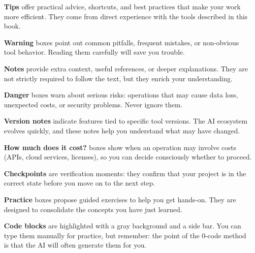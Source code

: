 \begin{tipbox}
\textbf{Tips} offer practical advice, shortcuts, and best practices that make your work more efficient. They come from direct experience with the tools described in this book.
\end{tipbox}

\begin{warnbox}
\textbf{Warning} boxes point out common pitfalls, frequent mistakes, or non-obvious tool behavior. Reading them carefully will save you trouble.
\end{warnbox}

\begin{notebox}
\textbf{Notes} provide extra context, useful references, or deeper explanations. They are not strictly required to follow the text, but they enrich your understanding.
\end{notebox}

\begin{dangerbox}
\textbf{Danger} boxes warn about serious risks: operations that may cause data loss, unexpected costs, or security problems. Never ignore them.
\end{dangerbox}

\begin{versionbox}
\textbf{Version notes} indicate features tied to specific tool versions. The AI ecosystem evolves quickly, and these notes help you understand what may have changed.
\end{versionbox}

\begin{costbox}
\textbf{How much does it cost?} boxes show when an operation may involve costs (APIs, cloud services, licenses), so you can decide consciously whether to proceed.
\end{costbox}

\begin{checkpointbox}
\textbf{Checkpoints} are verification moments: they confirm that your project is in the correct state before you move on to the next step.
\end{checkpointbox}

\begin{praticabox}
\textbf{Practice} boxes propose guided exercises to help you get hands-on. They are designed to consolidate the concepts you have just learned.
\end{praticabox}

\medskip
\noindent \textbf{Code blocks} are highlighted with a gray background and a side bar. You can type them manually for practice, but remember: the point of the 0-code method is that the AI will often generate them for you.

\newpage
